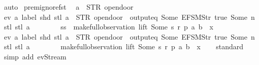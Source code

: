 \begin{isabellebody}
\ auto%
\endisatagproof
{\isafoldproof}%
%
\isadelimproof
\isanewline
%
\endisadelimproof
\isanewline
{}\isamarkupfalse%
\ prem{\isacharunderscore}ignore{\isacharunderscore}fst{\isacharcolon}\isanewline
\ \ {\isachardoublequoteopen}a\ {\isasymnoteq}\ STR\ {\isacharprime}{\isacharprime}opendoor{\isacharprime}{\isacharprime}\ {\isasymLongrightarrow}\isanewline
\ ev\ {\isacharparenleft}{\isasymlambda}a{\isachardot}\ label\ {\isacharparenleft}shd\ {\isacharparenleft}stl\ a{\isacharparenright}{\isacharparenright}\ {\isacharequal}\ STR\ {\isacharprime}{\isacharprime}opendoor{\isacharprime}{\isacharprime}\ {\isasymand}\ output{\isacharunderscore}eq\ {\isacharbrackleft}Some\ {\isacharparenleft}EFSM{\isachardot}Str\ {\isacharprime}{\isacharprime}true{\isacharprime}{\isacharprime}{\isacharparenright}{\isacharcomma}\ Some\ n{\isacharbrackright}\ {\isacharparenleft}stl\ {\isacharparenleft}stl\ a{\isacharparenright}{\isacharparenright}{\isacharparenright}\isanewline
\ \ \ \ \ \ \ \ {\isacharparenleft}ss\ {\isacharhash}{\isacharhash}\ make{\isacharunderscore}full{\isacharunderscore}observation\ lift\ {\isacharparenleft}Some\ s{\isacharprime}{\isacharparenright}\ r{\isacharprime}\ p{\isacharprime}\ {\isacharparenleft}{\isacharparenleft}a{\isacharcomma}\ b{\isacharparenright}\ {\isacharhash}{\isacharhash}\ x{}{\isacharparenright}{\isacharparenright}\ {\isacharequal}\isanewline
\ ev\ {\isacharparenleft}{\isasymlambda}a{\isachardot}\ label\ {\isacharparenleft}shd\ {\isacharparenleft}stl\ a{\isacharparenright}{\isacharparenright}\ {\isacharequal}\ STR\ {\isacharprime}{\isacharprime}opendoor{\isacharprime}{\isacharprime}\ {\isasymand}\ output{\isacharunderscore}eq\ {\isacharbrackleft}Some\ {\isacharparenleft}EFSM{\isachardot}Str\ {\isacharprime}{\isacharprime}true{\isacharprime}{\isacharprime}{\isacharparenright}{\isacharcomma}\ Some\ n{\isacharbrackright}\ {\isacharparenleft}stl\ {\isacharparenleft}stl\ a{\isacharparenright}{\isacharparenright}{\isacharparenright}\isanewline
\ \ \ \ \ \ \ \ {\isacharparenleft}make{\isacharunderscore}full{\isacharunderscore}observation\ lift\ {\isacharparenleft}Some\ s{\isacharprime}{\isacharparenright}\ r{\isacharprime}\ p{\isacharprime}\ {\isacharparenleft}{\isacharparenleft}a{\isacharcomma}\ b{\isacharparenright}\ {\isacharhash}{\isacharhash}\ x{}{\isacharparenright}{\isacharparenright}{\isachardoublequoteclose}\isanewline
%
\isadelimproof
\ \ %
\endisadelimproof
%
\isatagproof
{}\isamarkupfalse%
\ standard\isanewline
\ \ \ \isamarkupfalse%
\ {\isacharparenleft}simp\ add{\isacharcolon}\ ev{\isacharunderscore}Stream{\isacharparenright}\isanewline

\end{isabellebody}
